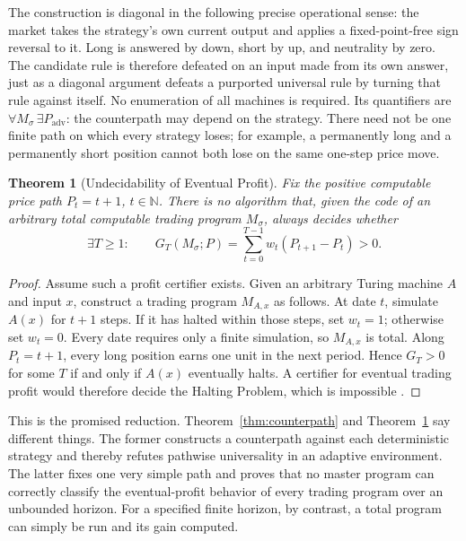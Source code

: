 \documentclass[aps,pra,reprint,superscriptaddress,amsmath,amssymb,floatfix]{revtex4-2}
\theoremstyle{plain}
\newtheorem{theorem}{Theorem}
\theoremstyle{definition}
\theoremstyle{remark}
\begin{document}
The construction is diagonal in the following precise operational sense: the
market takes the strategy's own current output and applies a fixed-point-free
sign reversal to it. Long is answered by down, short by up, and neutrality by
zero. The candidate rule is therefore defeated on an input made from its own
answer, just as a diagonal argument defeats a purported universal rule by
turning that rule against itself. No enumeration of all machines is required.
Its quantifiers are
\(\forall M_\sigma\,\exists P_{\mathrm{adv}}\): the counterpath may depend on
the strategy. There need not be one finite path on which every strategy loses;
for example, a permanently long and a permanently short position cannot both
lose on the same one-step price move.

\begin{theorem}[Undecidability of Eventual Profit]
  \label{thm:profit-undecidable}
  Fix the positive computable price path \(P_t=t+1\), \(t\in\mathbb{N}\).
  There is no algorithm that, given the code of an arbitrary total computable
  trading program \(M_\sigma\), always decides whether
  \[
    \exists T\geq1:\qquad
    G_T(M_\sigma;P)=
    \sum_{t=0}^{T-1}w_t(P_{t+1}-P_t)>0.
  \]
\end{theorem}

\begin{proof}
Assume such a profit certifier exists. Given an arbitrary Turing machine
\(A\) and input \(x\), construct a trading program \(M_{A,x}\) as follows.
At date \(t\), simulate \(A(x)\) for \(t+1\) steps. If it has halted within
those steps, set \(w_t=1\); otherwise set \(w_t=0\). Every date requires only
a finite simulation, so \(M_{A,x}\) is total. Along \(P_t=t+1\), every long
position earns one unit in the next period. Hence \(G_T>0\) for some \(T\) if
and only if \(A(x)\) eventually halts. A certifier for eventual trading profit
would therefore decide the Halting Problem, which is impossible
\cite{turing-36}.
\end{proof}

This is the promised reduction. Theorem~\ref{thm:counterpath} and
Theorem~\ref{thm:profit-undecidable} say different things. The former
constructs a counterpath against each deterministic strategy and thereby
refutes pathwise universality in an adaptive environment. The latter fixes one
very simple path and proves that no master program can correctly classify the
eventual-profit behavior of every trading program over an unbounded horizon.
For a specified finite horizon, by contrast, a total program can simply be run
and its gain computed.
\end{document}
